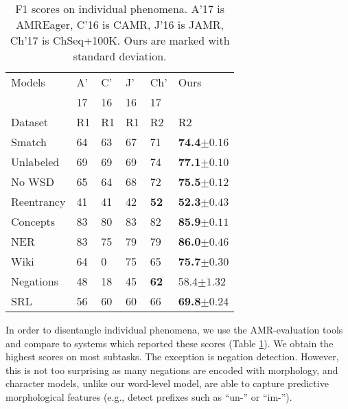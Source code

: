 \documentclass[11pt,a4paper]{article}
\begin{document}
\begin{table}[t] 
    \begin{center} 
        \begin{tabular}{llll|ll} 
            \hline  Models &  A' &  C'  &   J'  &    Ch'   & Ours\\  
             &17  &16   &16  &17   & \\ \hline
            Dataset &  R1 &R1   &R1   &R2   &R2 \\ \hline
             Smatch &  64 & 63  & 67 & {71} & {\bf74.4}$\pm 0.16 $\\
             \hline
            Unlabeled & 69  & 69&69 &{ 74} &  {\bf77.1}$\pm 0.10 $\\
            No WSD &    65  &64 & 68 & { 72 }&  {\bf75.5}$\pm 0.12$\\
            Reentrancy & 41   & 41  &42 & \bf 52 & {\bf52.3}$\pm 0.43$\\
            Concepts &    83  &80 &83& 82& {\bf 85.9}$\pm 0.11 $\\
            NER &  83  & 75  & 79 &79& \bf{86.0}$\pm 0.46 $\\
            Wiki &   64 &  0  &{75}& 65 &   {\bf75.7}$\pm 0.30 $\\
            Negations&    48  &18 &45 & \bf{62}& {58.4}$\pm 1.32 $\\
            SRL&     56  & 60 & 60 &66& {\bf 69.8}$\pm 0.24 $\\
            \hline
        \end{tabular}
    \end{center}
    \vspace{-1ex}
	\caption{\label{table:evaluation} F1 scores on individual phenomena. A'17 is AMREager, C'16 is CAMR, J'16 is JAMR, Ch'17 is ChSeq+100K. Ours are marked with standard deviation.
    }
    \vspace{-1ex}
\end{table}

In order to disentangle individual phenomena, we use the AMR-evaluation tools~\cite{Marco} and compare to systems which reported these scores (Table \ref{table:evaluation}). We obtain the highest scores on most subtasks. 
The exception is negation detection. However, this is not too surprising as many negations are encoded with morphology, and character models, unlike our word-level model, are able to capture predictive morphological features (e.g., detect prefixes such as ``un-'' or ``im-''). 
\end{document}
